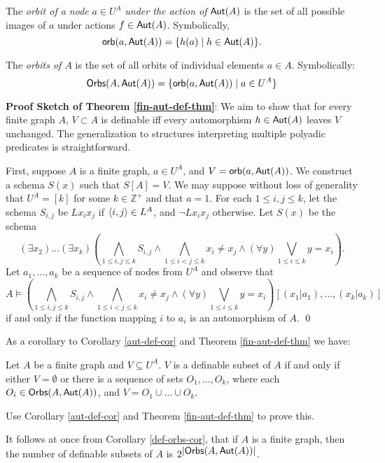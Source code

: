 \begin{definition}
The \emph{orbit of a node} $a\in U^A$ \emph{under the action of} $\mbox{$\mathsf{Aut}(A)$}$ is the set of all possible images of $a$ under actions $f \in \mbox{$\mathsf{Aut}(A)$}$. Symbolically,
\[
\mbox{$\mathsf{orb}(a,\mbox{$\mathsf{Aut}(A)$})$}=\{h(a)\mid h\in\mbox{$\mathsf{Aut}(A)$}\}.
\]
\end{definition}

\begin{definition}
The \emph{orbits of $A$} is the set of all orbits of individual elements $a \in A$. Symbolically:
\[
    \mbox{$\mathsf{Orbs}(A,\mbox{$\mathsf{Aut}(A)$})$}=\{\mbox{$\mathsf{orb}(a,\mbox{$\mathsf{Aut}(A)$})$}\mid a\in U^A\}
\]
\end{definition}
\textbf{Proof Sketch of Theorem \ref{fin-aut-def-thm}}:
We aim to show that for every finite graph $A$, $V \subset A$ is definable iff every automorphism $h \in \mbox{$\mathsf{Aut}(A)$}$ leaves $V$ unchanged. The generalization to structures interpreting multiple polyadic predicates is straightforward.

First, suppose $A$ is a finite graph, $a\in U^A$, and $V=\mbox{$\mathsf{orb}(a,\mbox{$\mathsf{Aut}(A)$})$}$. We construct a schema $S(x)$ such that $S[A]=V$. We may suppose without loss of generality that $U^A=[k]$ for some $k\in\mathbb{Z}^+$ and that $a=1$. For each $1\leq i,j\leq k$, let the schema $S_{i,j}$ be $Lx_ix_j$ if $\mbox{$\langle i,j \rangle$}\in L^A$, and $\neg Lx_ix_j$ otherwise. Let $S(x)$ be the schema
\[
(\exists x_2)\ldots(\exists x_k)(\bigwedge_{1\leq i,j\leq k}S_{i,j}\wedge\bigwedge_{1\leq i<j\leq k}x_i\neq x_j\wedge(\forall y)\bigvee_{1\leq i\leq k} y=x_i).
\] 
Let $a_1,\dots,a_k$ be a sequence of nodes from $U^A$ and observe that
\[
A\models(\bigwedge_{1\leq i,j\leq k}S_{i,j}\wedge\bigwedge_{1\leq i<j\leq k}x_i\neq x_j\wedge(\forall y)\bigvee_{1\leq i\leq k} y=x_i)[(x_1|a_1),\ldots,(x_k|a_k)]
\]
if and only if the function mapping $i$ to $a_i$ is an automorphism of $A$. \qed

As a corollary to Corollary \ref{aut-def-cor} and Theorem \ref{fin-aut-def-thm} we have:
\begin{corollary}\label{def-orbs-cor}
Let $A$ be a finite graph and $V\subseteq U^A$. $V$ is a definable subset of $A$ if and only if either $V=\emptyset$ or there is a sequence of sets $O_1, \ldots,O_k$, where each $O_i\in\mbox{$\mathsf{Orbs}(A,\mbox{$\mathsf{Aut}(A)$})$}$, and $V = O_1\cup\ldots\cup O_k$.
\end{corollary}

\begin{aside}
    Use Corollary \ref{aut-def-cor} and Theorem \ref{fin-aut-def-thm} to prove this. 
\end{aside}

It follows at once from Corollary \ref{def-orbs-cor}, that if $A$ is a finite graph, then the number of definable subsets of $A$ is $2^{\mbox{$|\mbox{$\mathsf{Orbs}(A,\mbox{$\mathsf{Aut}(A)$})$}|$}}$. 

